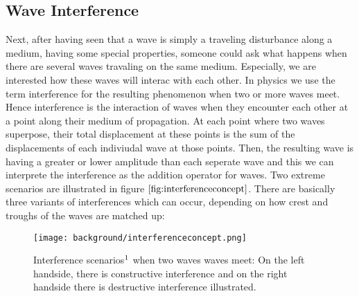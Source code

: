 \subsection{Wave Interference}
Next, after having seen that a wave is simply a traveling disturbance along a medium, having some special properties, someone could ask what happens when there are several waves travaling on the same medium. Especially, we are interested how these waves will interac with each other. In physics we use the term interference for the resulting phenomenon when two or more waves meet. Hence interference is the interaction of waves when they encounter each other at a point along their medium of propagation. At each point where two waves superpose, their total displacement at these points is the sum of the displacements of each indiviudal wave at those points. Then, the resulting wave is having a greater or lower amplitude than each seperate wave and this we can interprete the interference as the addition operator for waves. Two extreme scenarios are illustrated in figure $\ref{fig:interferenceconcept}$. There are basically three variants of interferences which can occur, depending on how crest and troughs of the waves are matched up:

\begin{figure}[H]
  \centering
  \texttt{[image: background/interferenceconcept.png]}
  \caption[interference]{Interference scenarios$\footnotemark$ when two waves waves meet: On the left handside, there is constructive interference and on the right handside there is destructive interference illustrated.}
  \label{fig:interferenceconcept}
\end{figure}

